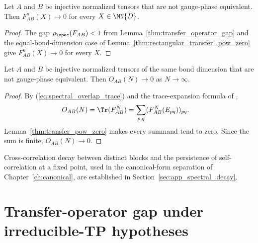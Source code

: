 \begin{lemma}\label{thm:transfer_pow_zero}
    \leanok
    Let $A$ and $B$ be injective normalized tensors that are not gauge-phase
    equivalent. Then $F_{AB}^n(X)\to0$ for every $X\in\MN{D}$.
\end{lemma}

\begin{proof}
    \leanok
    The gap $\rho_{\spec}(F_{AB})<1$ from
    Lemma~\ref{thm:transfer_operator_gap} and the equal-bond-dimension case
    of Lemma~\ref{thm:rectangular_transfer_pow_zero} give
    $F_{AB}^n(X)\to0$ for every $X$.
\end{proof}

\begin{theorem}\label{thm:overlap_decay}
    \leanok
    Let $A$ and $B$ be injective normalized tensors of the same bond
    dimension that are not gauge-phase equivalent. Then
    $O_{AB}(N)\to0$ as $N\to\infty$.
\end{theorem}

\begin{proof}
    \leanok
    By (\ref{eq:spectral_overlap_trace}) and
    the trace-expansion formula of
    \cite[``Trace expansion over matrix units'']{QICLean2026Blueprint},
    \begin{align}
        O_{AB}(N)
         & =\Tr(F_{AB}^N)
        =\sum_{p,q}(F_{AB}^N(E_{pq}))_{pq}.
        \notag
    \end{align}
    Lemma~\ref{thm:transfer_pow_zero} makes every summand tend to zero.
    Since the sum is finite, $O_{AB}(N)\to0$.
\end{proof}

Cross-correlation decay between distinct blocks and the persistence of
self-correlation at a fixed point, used in the canonical-form separation of
Chapter~\ref{ch:canonical}, are established in
Section~\ref{sec:app_spectral_decay}.

\section{Transfer-operator gap under irreducible-TP hypotheses}

